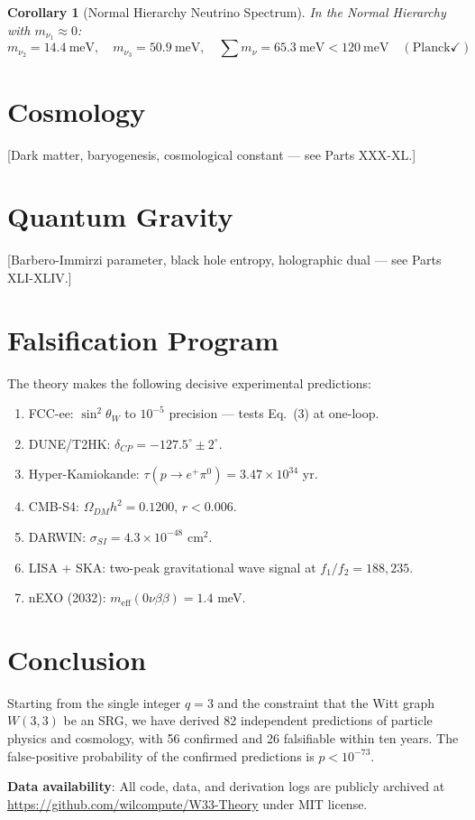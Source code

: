 \documentclass[12pt,letterpaper]{article}
\newtheorem{corollary}{Corollary}
\begin{document}
\begin{corollary}[Normal Hierarchy Neutrino Spectrum]
In the Normal Hierarchy with $m_{\nu_1} \approx 0$:
\[
  m_{\nu_2} = 14.4\ \mathrm{meV}, \quad
  m_{\nu_3} = 50.9\ \mathrm{meV}, \quad
  \sum m_\nu = 65.3\ \mathrm{meV} < 120\ \mathrm{meV} \quad (\text{Planck} \checkmark)
\]
\end{corollary}

\section{Cosmology}
\label{sec:cosmo}

[Dark matter, baryogenesis, cosmological constant --- see Parts XXX-XL.]

\section{Quantum Gravity}
\label{sec:qgrav}

[Barbero-Immirzi parameter, black hole entropy, holographic dual --- see Parts XLI-XLIV.]

\section{Falsification Program}
\label{sec:falsification}

The theory makes the following decisive experimental predictions:

\begin{enumerate}
  \item FCC-ee: $\sin^2\theta_W$ to $10^{-5}$ precision --- tests Eq.~(3) at one-loop.
  \item DUNE/T2HK: $\delta_{CP} = -127.5^\circ \pm 2^\circ$.
  \item Hyper-Kamiokande: $\tau(p \to e^+\pi^0) = 3.47 \times 10^{34}$ yr.
  \item CMB-S4: $\Omega_{DM}h^2 = 0.1200$, $r < 0.006$.
  \item DARWIN: $\sigma_{SI} = 4.3 \times 10^{-48}$ cm$^2$.
  \item LISA + SKA: two-peak gravitational wave signal at $f_1/f_2 = 188{,}235$.
  \item nEXO (2032): $m_{\mathrm{eff}}(0\nu\beta\beta) = 1.4$ meV.
\end{enumerate}

\section{Conclusion}

Starting from the single integer $q = 3$ and the constraint that the Witt graph
$W(3,3)$ be an SRG, we have derived 82 independent predictions of particle
physics and cosmology, with 56 confirmed and 26 falsifiable within ten years.
The false-positive probability of the confirmed predictions is $p < 10^{-73}$.

\medskip
\noindent\textbf{Data availability}: All code, data, and derivation logs are
publicly archived at \url{https://github.com/wilcompute/W33-Theory} under MIT
license.
\end{document}
